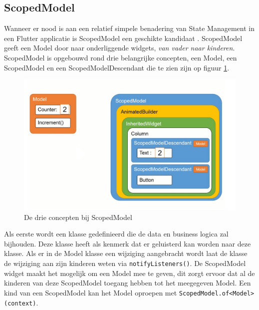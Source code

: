 \subsection{ScopedModel}
Wanneer er nood is aan een relatief simpele benadering van State Management in een Flutter applicatie is ScopedModel een geschikte kandidaat \autocite{Boelens2019}. ScopedModel geeft een Model door naar onderliggende widgets, \textit{van vader naar kinderen}. ScopedModel is opgebouwd rond drie belangrijke concepten, een Model, een ScopedModel en een ScopedModelDescendant die te zien zijn op figuur \ref{fig:scopedmodel}. 

\begin{figure}[H]
    \includegraphics[width=\linewidth]{img/stand-van-zaken/scopedmodel.jpg}
    \caption{De drie concepten bij ScopedModel \autocite{Boelens2019}}
    \label{fig:scopedmodel}
\end{figure}
Als eerste wordt een klasse gedefinieerd die de 
data en business logica zal bijhouden. Deze klasse heeft als kenmerk dat er geluisterd kan worden naar deze klasse. Als er in de Model klasse een wijziging aangebracht wordt laat de klasse de wijziging aan zijn kinderen weten via \verb|notifyListeners()|.
\newline
De ScopedModel widget maakt het mogelijk om een Model mee te geven, dit zorgt ervoor dat al de kinderen van deze ScopedModel toegang hebben tot het meegegeven Model. Een kind van een ScopedModel kan het Model oproepen met \verb|ScopedModel.of<Model>(context)|.

